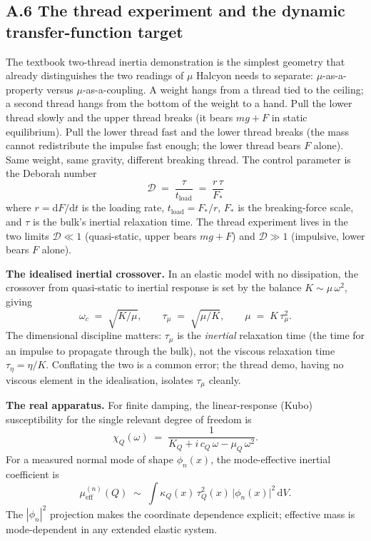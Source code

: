 \documentclass[12pt,a4paper]{article}
\theoremstyle{plain}
\theoremstyle{definition}
\theoremstyle{remark}
\begin{document}
\subsection*{A.6 The thread experiment and the dynamic transfer-function target}

The textbook two-thread inertia demonstration \cite[Vol.~I, \S10--2]{feynman_lectures} is the simplest geometry that already distinguishes the two readings of $\mu$ Halcyon needs to separate: $\mu$-as-a-property versus $\mu$-as-a-coupling. A weight hangs from a thread tied to the ceiling; a second thread hangs from the bottom of the weight to a hand. Pull the lower thread slowly and the upper thread breaks (it bears $mg + F$ in static equilibrium). Pull the lower thread fast and the lower thread breaks (the mass cannot redistribute the impulse fast enough; the lower thread bears $F$ alone). Same weight, same gravity, different breaking thread. The control parameter is the Deborah number \cite{reiner1964}
\begin{equation}
    \mathcal{D} \;=\; \frac{\tau}{t_{\mathrm{load}}} \;=\; \frac{r\,\tau}{F_*}
\end{equation}
where $r=\mathrm{d}F/\mathrm{d}t$ is the loading rate, $t_{\mathrm{load}}=F_*/r$, $F_*$ is the breaking-force scale, and $\tau$ is the bulk's inertial relaxation time. The thread experiment lives in the two limits $\mathcal{D}\ll 1$ (quasi-static, upper bears $mg+F$) and $\mathcal{D}\gg 1$ (impulsive, lower bears $F$ alone).

\textbf{The idealised inertial crossover.} In an elastic model with no dissipation, the crossover from quasi-static to inertial response is set by the balance $K \sim \mu\,\omega^{2}$, giving
\begin{equation}
    \omega_{c} \;=\; \sqrt{K/\mu}, \qquad \tau_{\mu} \;=\; \sqrt{\mu/K}, \qquad \mu \;=\; K\,\tau_{\mu}^{2}.
\label{eq:inertial-crossover}
\end{equation}
The dimensional discipline matters: $\tau_{\mu}$ is the \emph{inertial} relaxation time (the time for an impulse to propagate through the bulk), not the viscous relaxation time $\tau_{\eta}=\eta/K$. Conflating the two is a common error; the thread demo, having no viscous element in the idealisation, isolates $\tau_{\mu}$ cleanly.

\textbf{The real apparatus.} For finite damping, the linear-response (Kubo) susceptibility for the single relevant degree of freedom \cite[\S6.4]{goldstein_classical_mechanics} is
\begin{equation}
    \chi_{Q}(\omega) \;=\; \frac{1}{K_{Q} + i\,c_{Q}\,\omega - \mu_{Q}\,\omega^{2}}.
\end{equation}
For a measured normal mode of shape $\phi_{n}(x)$, the mode-effective inertial coefficient is
\begin{equation}
    \mu_{\mathrm{eff}}^{(n)}(Q) \;\sim\; \int \kappa_{Q}(x)\,\tau_{Q}^{2}(x)\,\lvert \phi_{n}(x)\rvert^{2}\,\mathrm{d}V.
\label{eq:mode-effective-mass}
\end{equation}
The $|\phi_{n}|^{2}$ projection makes the coordinate dependence explicit; effective mass is mode-dependent in any extended elastic system.
\end{document}
